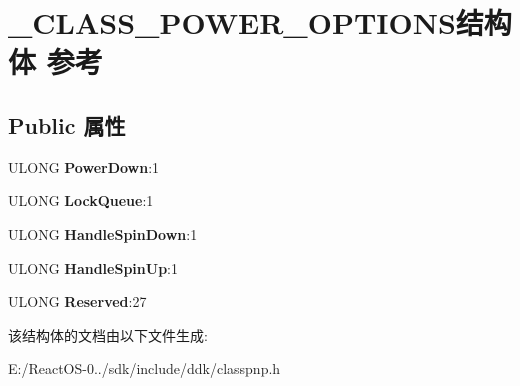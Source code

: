 \hypertarget{struct___c_l_a_s_s___p_o_w_e_r___o_p_t_i_o_n_s}{}\section{\+\_\+\+C\+L\+A\+S\+S\+\_\+\+P\+O\+W\+E\+R\+\_\+\+O\+P\+T\+I\+O\+N\+S结构体 参考}
\label{struct___c_l_a_s_s___p_o_w_e_r___o_p_t_i_o_n_s}
\subsection*{Public 属性}
\begin{DoxyCompactItemize}
\item 
\mbox{\label{struct___c_l_a_s_s___p_o_w_e_r___o_p_t_i_o_n_s_a87095e97699ca05b8d8ad6a90a28f2a7}} 
U\+L\+O\+NG {\bfseries Power\+Down}\+:1
\item 
\mbox{\label{struct___c_l_a_s_s___p_o_w_e_r___o_p_t_i_o_n_s_acfe5d1af48304eee2faf7cb20ec34627}} 
U\+L\+O\+NG {\bfseries Lock\+Queue}\+:1
\item 
\mbox{\label{struct___c_l_a_s_s___p_o_w_e_r___o_p_t_i_o_n_s_a469248da5e0cd8b10cc49183a3ca53a3}} 
U\+L\+O\+NG {\bfseries Handle\+Spin\+Down}\+:1
\item 
\mbox{\label{struct___c_l_a_s_s___p_o_w_e_r___o_p_t_i_o_n_s_a50b453382f618cf71f77a5a377c6ea30}} 
U\+L\+O\+NG {\bfseries Handle\+Spin\+Up}\+:1
\item 
\mbox{\label{struct___c_l_a_s_s___p_o_w_e_r___o_p_t_i_o_n_s_aac0ab860db175c3425b1492b350a657c}} 
U\+L\+O\+NG {\bfseries Reserved}\+:27
\end{DoxyCompactItemize}


该结构体的文档由以下文件生成\+:\begin{DoxyCompactItemize}
\item 
E\+:/\+React\+O\+S-\/0../sdk/include/ddk/classpnp.\+h\end{DoxyCompactItemize}
